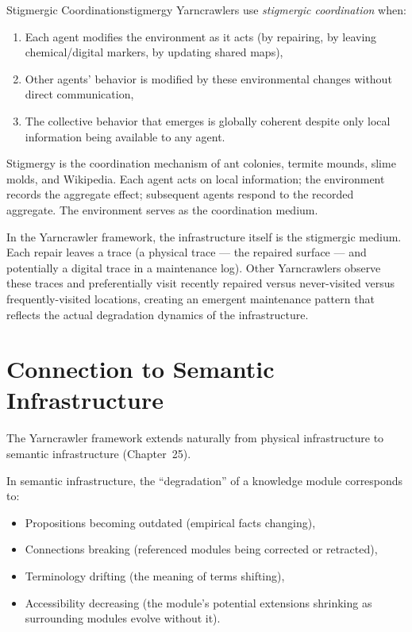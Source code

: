 \begin{definition}{Stigmergic Coordination}{stigmergy}
  Yarncrawlers use \emph{stigmergic coordination} when:
  \begin{enumerate}
    \item Each agent modifies the environment as it acts
          (by repairing, by leaving chemical/digital markers,
          by updating shared maps),
    \item Other agents' behavior is modified by these environmental
          changes without direct communication,
    \item The collective behavior that emerges is globally coherent
          despite only local information being available to any agent.
  \end{enumerate}
\end{definition}

Stigmergy is the coordination mechanism of ant colonies, termite
mounds, slime molds, and Wikipedia. Each agent acts on local information;
the environment records the aggregate effect; subsequent agents respond
to the recorded aggregate. The environment serves as the coordination
medium.

In the Yarncrawler framework, the infrastructure itself is the stigmergic
medium. Each repair leaves a trace (a physical trace — the repaired
surface — and potentially a digital trace in a maintenance log).
Other Yarncrawlers observe these traces and preferentially visit
recently repaired versus never-visited versus frequently-visited locations,
creating an emergent maintenance pattern that reflects the actual
degradation dynamics of the infrastructure.

\section{Connection to Semantic Infrastructure}

The Yarncrawler framework extends naturally from physical infrastructure
to semantic infrastructure (Chapter~25).

In semantic infrastructure, the ``degradation'' of a knowledge module
corresponds to:
\begin{itemize}
  \item Propositions becoming outdated (empirical facts changing),
  \item Connections breaking (referenced modules being corrected
        or retracted),
  \item Terminology drifting (the meaning of terms shifting),
  \item Accessibility decreasing (the module's potential extensions
        shrinking as surrounding modules evolve without it).
\end{itemize}

